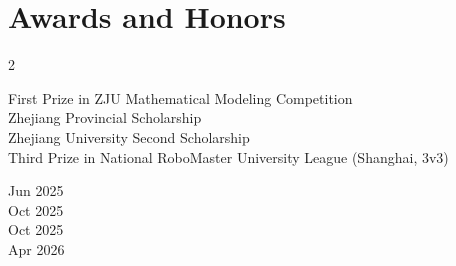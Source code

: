 \documentclass[10pt, letterpaper]{article}
\newenvironment{twocolentry}[2][]{
    \onecolentry
    \def\secondColumn{#2}
    \setcolumnwidth{\fill, 4.5 cm}
    \begin{paracol}{2}
}{
    \switchcolumn \raggedleft \secondColumn
    \end{paracol}
    \endonecolentry
} %
\begin{document}
    \section{Awards and Honors}

    \begin{twocolentry}{
	Jun 2025 \\
	Oct 2025 \\
	Oct 2025 \\
	Apr 2026
      }
      First Prize in ZJU Mathematical Modeling Competition \\
      Zhejiang Provincial Scholarship \\
      Zhejiang University Second Scholarship \\
      Third Prize in National RoboMaster University League (Shanghai, 3v3)
    \end{twocolentry}
\end{document}

